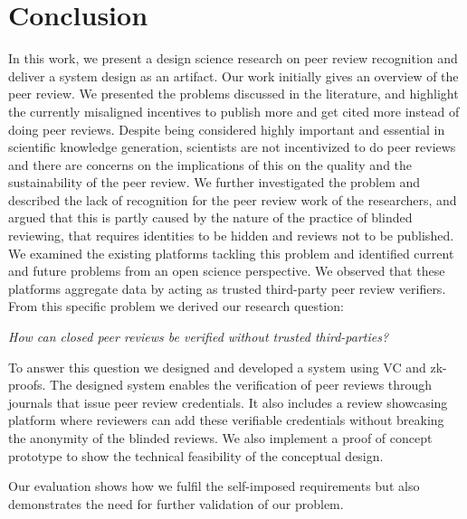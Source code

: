 
\chapter{Conclusion}\label{chapter:conclusion}

In this work, we present a design science research on peer review recognition and deliver a system design as an artifact. Our work initially gives an overview of the peer review. We presented the problems discussed in the literature, and highlight the currently misaligned incentives to publish more and get cited more instead of doing peer reviews. Despite being considered highly important and essential in scientific knowledge generation, scientists are not incentivized to do peer reviews and there are concerns on the implications of this on the quality and the sustainability of the peer review. We further investigated the problem and described the lack of recognition for the peer review work of the researchers, and argued that this is partly caused by the nature of the practice of blinded reviewing, that requires identities to be hidden and reviews not to be published. We examined the existing platforms tackling this problem and identified current and future problems from an open science perspective. We observed that these platforms aggregate data by acting as trusted third-party peer review verifiers. From this specific problem we derived our research question:

\begin{center}
    \textit{How can closed peer reviews be verified without trusted third-parties?}
\end{center}

To answer this question we designed and developed a system using \acrlong{VC} and \acrfull{zk-proofs}. The designed system enables the verification of peer reviews through journals that issue peer review credentials. It also includes a review showcasing platform where reviewers can add these verifiable credentials without breaking the anonymity of the blinded reviews. We also implement a proof of concept prototype to show the technical feasibility of the conceptual design.

Our evaluation shows how we fulfil the self-imposed requirements but also demonstrates the need for further validation of our problem. 